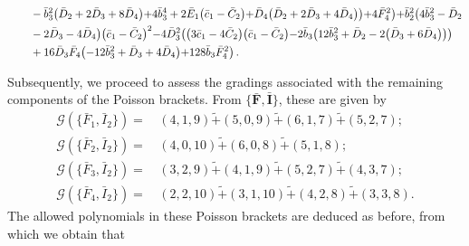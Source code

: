\documentclass[10pt]{amsart}
\theoremstyle{definition}
\theoremstyle{corollary}
\theoremstyle{remark}
\theoremstyle{conclusion}
\begin{document}
\begin{align}
& \hskip 0.7cm-\bar{b}_3^2 \bigl(\bar{D}_2+2 \bar{D}_3+8 \bar{D}_4\bigl)+4 \bar{b}_3^4+2 \bar{E}_1 \bigl(\bar{c}_1-\bar{C}_2\bigl)+\bar{D}_4 \bigl(\bar{D}_2+2 \bar{D}_3+4 \bar{D}_4\bigl)\bigl)+4 \bar{F}_4^2\bigl)+\bar{b}_2^2 \bigl(4 \bar{b}_3^2-\bar{D}_2 \nonumber \\
& \hskip 0.7cm-2 \bar{D}_3-4 \bar{D}_4\bigl) \bigl(\bar{c}_1-\bar{C}_2\bigl)^2-4 \bar{D}_3^2 \bigl(\bigl(3 \bar{c}_1-4 \bar{C}_2\bigl) \bigl(\bar{c}_1-\bar{C}_2\bigl)-2 \bar{b}_3 \bigl(12 \bar{b}_3^2+\bar{D}_2-2 \bigl(\bar{D}_3+6 \bar{D}_4\bigl)\bigl)\bigl) \nonumber \\
& \hskip 0.7cm+16 \bar{D}_3 \bar{F}_4 \bigl(-12 \bar{b}_3^2+\bar{D}_3+4 \bar{D}_4\bigl)+128 \bar{b}_3 \bar{F}_4^2\bigl) \, . 
\end{align} 

Subsequently, we proceed to assess the gradings associated with the remaining components of the Poisson brackets. From $\{\bar{\textbf{F}},\bar{\textbf{I}}\}$, these are given by  \begin{align}
     \mathcal{G} \left(\{\bar{F}_1, \bar{I}_2\}\right)  = & \,  (4,1,9) \tilde{+} (5,0,9)\tilde{+} (6,1,7)\tilde{+} (5,2,7); \nonumber \\
    \mathcal{G} \left(\{\bar{F}_2, \bar{I}_2\}\right)  = & \, (4,0,10) \tilde{+} (6,0,8)\tilde{+} (5,1,8); \nonumber \\
    \mathcal{G} \left(\{\bar{F}_3, \bar{I}_2\}\right)  = & \, (3,2,9) \tilde{+} (4,1,9)\tilde{+} (5,2,7)\tilde{+} (4,3,7); \nonumber \\
    \mathcal{G} \left(\{\bar{F}_4, \bar{I}_2\}\right)  = & \,(2,2,10) \tilde{+} (3,1,10)\tilde{+} (4,2,8)\tilde{+} (3,3,8).
\end{align} 
  The allowed polynomials in these Poisson brackets are deduced as before, from which we  obtain that 
\end{document}
